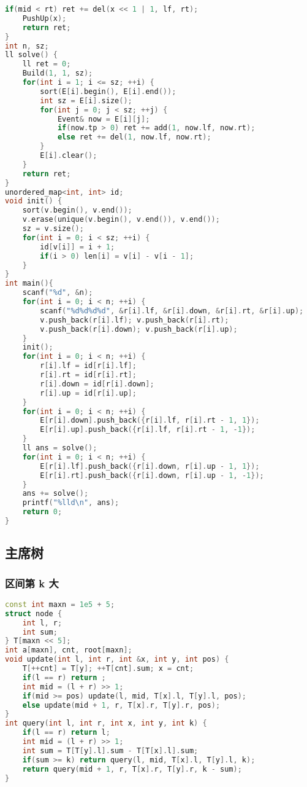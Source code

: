 \begin{lstlisting}[language=C++]
    if(mid < rt) ret += del(x << 1 | 1, lf, rt);
    PushUp(x);
    return ret;
}
int n, sz;
ll solve() {
    ll ret = 0;
    Build(1, 1, sz);
    for(int i = 1; i <= sz; ++i) {
        sort(E[i].begin(), E[i].end());
        int sz = E[i].size();
        for(int j = 0; j < sz; ++j) {
            Event& now = E[i][j];
            if(now.tp > 0) ret += add(1, now.lf, now.rt);
            else ret += del(1, now.lf, now.rt);
        }
        E[i].clear();
    }
    return ret;
}
unordered_map<int, int> id;
void init() {
    sort(v.begin(), v.end());
    v.erase(unique(v.begin(), v.end()), v.end());
    sz = v.size();
    for(int i = 0; i < sz; ++i) {
        id[v[i]] = i + 1;
        if(i > 0) len[i] = v[i] - v[i - 1];
    }
}
int main(){
    scanf("%d", &n);
    for(int i = 0; i < n; ++i) {
        scanf("%d%d%d%d", &r[i].lf, &r[i].down, &r[i].rt, &r[i].up);
        v.push_back(r[i].lf); v.push_back(r[i].rt);
        v.push_back(r[i].down); v.push_back(r[i].up);
    }
    init();
    for(int i = 0; i < n; ++i) {
        r[i].lf = id[r[i].lf];
        r[i].rt = id[r[i].rt];
        r[i].down = id[r[i].down];
        r[i].up = id[r[i].up];
    }
    for(int i = 0; i < n; ++i) {
        E[r[i].down].push_back({r[i].lf, r[i].rt - 1, 1});
        E[r[i].up].push_back({r[i].lf, r[i].rt - 1, -1});
    }
    ll ans = solve();
    for(int i = 0; i < n; ++i) {
        E[r[i].lf].push_back({r[i].down, r[i].up - 1, 1});
        E[r[i].rt].push_back({r[i].down, r[i].up - 1, -1});
    }
    ans += solve();
    printf("%lld\n", ans);
    return 0;
}
\end{lstlisting}

\subsection{主席树}

\subsubsection{区间第 k 大}

\begin{lstlisting}[language=C++]
const int maxn = 1e5 + 5;
struct node {
    int l, r;
    int sum;
} T[maxn << 5];
int a[maxn], cnt, root[maxn];
void update(int l, int r, int &x, int y, int pos) {
    T[++cnt] = T[y]; ++T[cnt].sum; x = cnt;
    if(l == r) return ;
    int mid = (l + r) >> 1;
    if(mid >= pos) update(l, mid, T[x].l, T[y].l, pos);
    else update(mid + 1, r, T[x].r, T[y].r, pos);
}
int query(int l, int r, int x, int y, int k) {
    if(l == r) return l;
    int mid = (l + r) >> 1;
    int sum = T[T[y].l].sum - T[T[x].l].sum;
    if(sum >= k) return query(l, mid, T[x].l, T[y].l, k);
    return query(mid + 1, r, T[x].r, T[y].r, k - sum);
}
\end{lstlisting}

